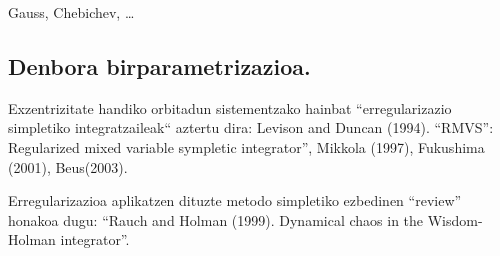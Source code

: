 Gauss, Chebichev, \dots 

\subsection*{Denbora birparametrizazioa.}

Exzentrizitate handiko orbitadun sistementzako hainbat “erregularizazio simpletiko integratzaileak“ aztertu dira:
Levison and Duncan (1994). “RMVS”: Regularized mixed variable sympletic integrator”, Mikkola (1997), Fukushima (2001), Beus(2003).

Erregularizazioa aplikatzen dituzte metodo simpletiko ezbedinen “review” honakoa dugu: “Rauch
and Holman (1999). Dynamical chaos in the Wisdom-Holman integrator”.


